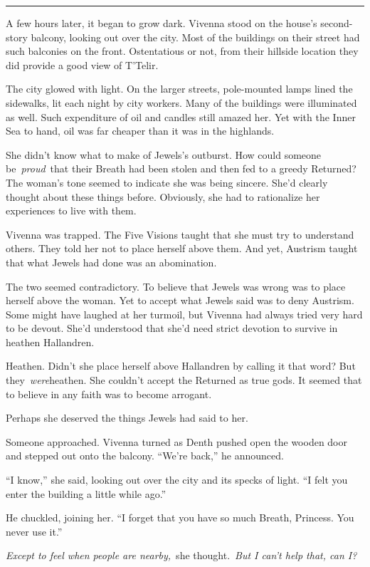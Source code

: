 \bigskip \hrule \bigskip

A few hours later, it began to grow dark. Vivenna stood on the house’s second-story balcony, looking out over the city. Most of the buildings on their street had such balconies on the front. Ostentatious or not, from their hillside location they did provide a good view of T’Telir.

The city glowed with light. On the larger streets, pole-mounted lamps lined the sidewalks, lit each night by city workers. Many of the buildings were illuminated as well. Such expenditure of oil and candles still amazed her. Yet with the Inner Sea to hand, oil was far cheaper than it was in the highlands.

She didn’t know what to make of Jewels’s outburst. How could someone be~\textit{proud}~that their Breath had been stolen and then fed to a greedy Returned? The woman’s tone seemed to indicate she was being sincere. She’d clearly thought about these things before. Obviously, she had to rationalize her experiences to live with them.

Vivenna was trapped. The Five Visions taught that she must try to understand others. They told her not to place herself above them. And yet, Austrism taught that what Jewels had done was an abomination.

The two seemed contradictory. To believe that Jewels was wrong was to place herself above the woman. Yet to accept what Jewels said was to deny Austrism. Some might have laughed at her turmoil, but Vivenna had always tried very hard to be devout. She’d understood that she’d need strict devotion to survive in heathen Hallandren.

Heathen. Didn’t she place herself above Hallandren by calling it that word? But they~\textit{were}heathen. She couldn’t accept the Returned as true gods. It seemed that to believe in any faith was to become arrogant.

Perhaps she deserved the things Jewels had said to her.

Someone approached. Vivenna turned as Denth pushed open the wooden door and stepped out onto the balcony. “We’re back,” he announced.

“I know,” she said, looking out over the city and its specks of light. “I felt you enter the building a little while ago.”

He chuckled, joining her. “I forget that you have so much Breath, Princess. You never use it.”

\textit{Except to feel when people are nearby,}~she thought.~\textit{But I can’t help that, can I?}

